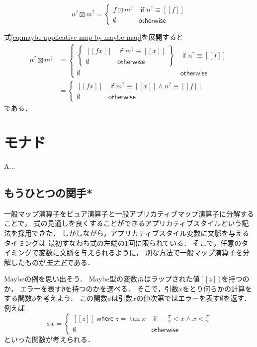 \documentclass[a4paper,draft]{jsbook}
\def\[{\left[\!\left[}
\def\]{\right]\!\right]}
\newenvironment{leader}{\begingroup}{\endgroup}
\newcommand{\keyword}[1]{{\underline{\emph{#1}}}}
\newcommand{\mNothing}{\emptyset}
\newcommand{\mKeyword}[1]{\mathsf{#1}}
\newcommand{\mIfKeyword}{\mKeyword{if}}
\newcommand{\mOtherwiseKeyword}{\mKeyword{otherwise}}
\newcommand{\mMaybeWith}[1]{\[#1\]}
\newcommand{\mMaybe}[1]{{#1}^\text{?}}
\DeclareMathOperator{\mMapMaybe}{\boxdot}
\DeclareMathOperator{\mApplicativeMapMaybe}{\boxtimes}
\DeclareMathOperator{\mLogicalAnd}{\wedge}
\DeclareMathOperator{\mIf}{\mIfKeyword}
\DeclareMathOperator{\mOtherwise}{\mOtherwiseKeyword}
\newcommand{\mathMaybeVar}[1]{\Tilde{#1}}
\newcommand{\mathMaybeWith}[1]{\[#1\]}
\newcommand{\mathNothing}{\emptyset}
\newcommand{\mathAnd}{\mathbin{\wedge}}
\newcommand{\mathKeyword}[1]{\operatorname{\textsf{#1}}}
\newcommand{\mathIf}{\mathKeyword{if}}
\newcommand{\mathOtherwise}{\mathKeyword{otherwise}}
\newcommand{\mathWhere}{\mathKeyword{where}}
\begin{document}
\begin{equation}
\label{eq:maybe-applicative-map-by-maybe-map}
\mMaybe{n}\mApplicativeMapMaybe\mMaybe{m}
=\begin{cases}
f\mMapMaybe\mMaybe{m}&\mIf\mMaybe{n}\equiv\mMaybeWith{f}\\
\mNothing&\mOtherwise
\end{cases}
\end{equation}

式\eqref{eq:maybe-applicative-map-by-maybe-map}を展開すると
\begin{align}
\mMaybe{n}\mApplicativeMapMaybe\mMaybe{m}
&=\begin{cases}
\left\{
\begin{array}{ll}
\mMaybeWith{fx}&\mIf\mMaybe{m}\equiv\mMaybeWith{x}\\
\mNothing&\mOtherwise
\end{array}\right\}
&\mIf\mMaybe{n}\equiv\mMaybeWith{f}\\
\mNothing&\mOtherwise
\end{cases}\\
&=\begin{cases}
\mMaybeWith{fx}&\mIf\mMaybe{m}\equiv\mMaybeWith{x}\mLogicalAnd\mMaybe{n}\equiv\mMaybeWith{f}\\
\mNothing&\mOtherwise
\end{cases}
\end{align}
である．



\chapter{モナド}

\begin{leader}
A...
\end{leader}


\section{もうひとつの関手*}


一般マップ演算子をピュア演算子と一般アプリカティブマップ演算子に分解することで，
式の見通しを良くすることができるアプリカティブスタイルという記法を採用できた．
しかしながら，アプリカティブスタイル変数に文脈を与えるタイミングは
最初すなわち式の左端の1回に限られている．
そこで，任意のタイミングで変数に文脈を与えられるように，
別な方法で一般マップ演算子を分解したものが\keyword{モナド}である．

Maybeの例を思い出そう．
Maybe型の変数$\mathMaybeVar{m}$はラップされた値$\mathMaybeWith{z}$を持つのか，
エラーを表す$\mathNothing$を持つのかを選べる．
そこで，引数$x$をとり何らかの計算をする関数$\phi$を考えよう．
この関数$\phi$は引数$x$の値次第ではエラーを表す$\mathNothing$を返す．
例えば
\begin{equation}
\phi x=\begin{cases}
\mathMaybeWith{z}\mathWhere z=\tan x&\mathIf -\frac{\pi}{2}<x\mathAnd x<\frac{\pi}{2}\\
\mathNothing&\mathOtherwise
\end{cases}
\end{equation}
といった関数が考えられる．
\end{document}
